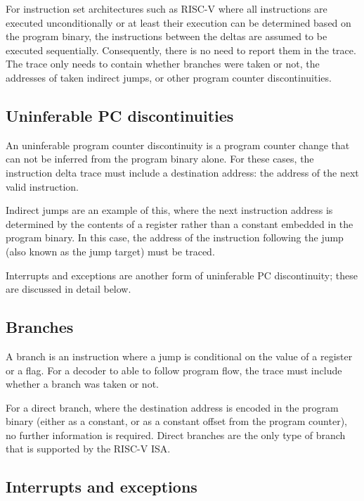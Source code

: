 For instruction set architectures such as RISC-V where all instructions are executed
unconditionally or at least their execution can be determined based on
the program binary, the instructions between the deltas are assumed to be
executed sequentially. Consequently, there is no need
to report them in the trace. The trace only needs to contain whether
branches were taken or not, the addresses of taken indirect jumps, or
other program counter discontinuities.

\subsection{Uninferable PC discontinuities} \label{uninfpc}

An uninferable program counter discontinuity is a program counter change
that can not be inferred from the program binary alone. For these cases,
the instruction delta trace must include a destination address: the
address of the next valid instruction.

Indirect jumps are an example of this, where
the next instruction address is determined by the contents of a
register rather than a constant embedded in the program binary.  In this 
case, the address of the instruction following the jump (also known as the
jump target) must be traced.

Interrupts and exceptions are another form of uninferable PC discontinuity;
these are discussed in detail below.

\subsection{Branches} \label{branches}

A branch is an instruction where a jump is conditional on the
value of a register or a flag. For a decoder to able to follow program flow,
the trace must include whether a branch was taken or not.

For a direct branch, where the destination address is encoded in the 
program binary (either as a constant, or as a constant offset from the
program counter), no further information is required.
Direct branches are the only type of branch that is supported by the
RISC-V ISA.

\subsection{Interrupts and exceptions} \label{interruptsexceptions}

